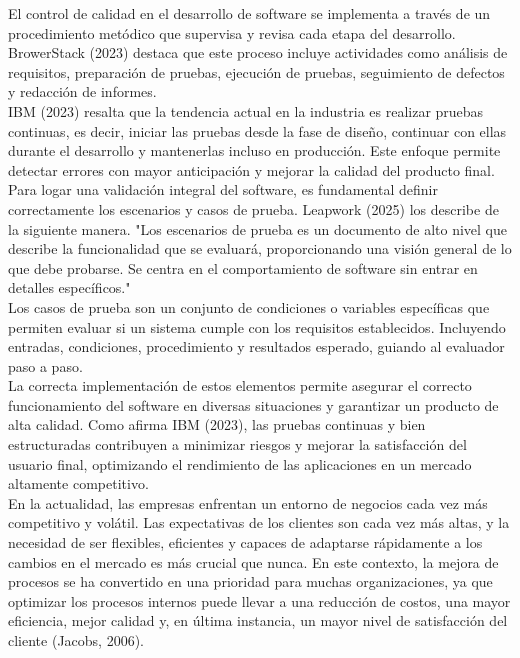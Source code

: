 \documentclass[12pt,letterpaper,spanish, xcolor=table]{report}
\numberwithin{figure}{subsection}
\begin{document}
El control de calidad en el desarrollo de software se implementa a través de un procedimiento metódico que supervisa y revisa cada etapa del desarrollo. BrowerStack (2023) destaca que este proceso incluye actividades como análisis de requisitos, preparación de pruebas, ejecución de pruebas, seguimiento de defectos y redacción de informes.\\

IBM (2023) resalta que la tendencia actual en la industria es realizar pruebas continuas, es decir, iniciar las pruebas desde la fase de diseño, continuar con ellas durante el desarrollo y mantenerlas incluso en producción. Este enfoque permite detectar errores con mayor anticipación y mejorar la calidad del producto final.\\

Para logar una validación integral del software, es fundamental definir correctamente los escenarios y casos de prueba. Leapwork (2025) los describe de la siguiente manera. "Los escenarios de prueba es un documento de alto nivel que describe la funcionalidad que se evaluará, proporcionando una visión general de lo que debe probarse. Se centra en el comportamiento de software sin entrar en detalles específicos."\\

Los casos de prueba son un conjunto de condiciones o variables específicas que permiten evaluar si un sistema cumple con los requisitos establecidos. Incluyendo entradas, condiciones, procedimiento y resultados esperado, guiando al evaluador paso a paso.\\

La correcta implementación de estos elementos permite asegurar el correcto funcionamiento del software en diversas situaciones y garantizar un producto de alta calidad. Como afirma IBM (2023), las pruebas continuas y bien estructuradas contribuyen a minimizar riesgos y mejorar la satisfacción del usuario final, optimizando el rendimiento de las aplicaciones en un mercado altamente competitivo.\\

En la actualidad, las empresas enfrentan un entorno de negocios cada vez más 
competitivo y volátil. Las expectativas de los clientes son cada vez más altas, y la necesidad de ser flexibles, eficientes y capaces de adaptarse rápidamente a los cambios en el mercado es más crucial que nunca. En este contexto, la mejora de procesos se ha convertido en una prioridad para muchas organizaciones, ya que optimizar los procesos internos puede llevar a una reducción de costos, una mayor eficiencia, mejor calidad y, en última instancia, un mayor nivel de satisfacción del cliente (Jacobs, 2006). \\
\end{document}
